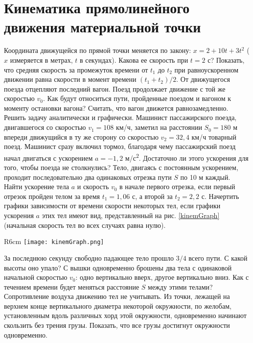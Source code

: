 \section{Кинематика прямолинейного движения материальной точки}
\AddProb Координата движущейся по прямой точки меняется по закону: $x = 2 + 10t + 3t^2$ ($x$ измеряется в метрах, $t$ в секундах). Какова ее скорость при $t = 2$ с?
\AddProb Показать, что средняя скорость за промежуток времени от $t_1$ до $t_2$ при равноускоренном движении равна скорости в момент времени $(t_1 + t_2)/2$.
\AddProb От движущегося поезда отцепляют последний вагон. Поезд продолжает движение с той же скоростью $v_0$. Как будут относиться пути, пройденные поездом и вагоном к моменту остановки вагона? Считать, что вагон движется равнозамедленно. Решить задачу аналитически и графически.
\AddProb Машинист пассажирского поезда, двигавшегося со скоростью $v_1 = 108$ км/ч, заметил на расстоянии $S_0 = 180$ м впереди движущийся в ту же сторону со скоростью $v_2 = 32,4$ км/ч товарный поезд. Машинист сразу включил тормоз, благодаря чему пассажирский поезд начал двигаться с ускорением $a = -1,2$ м/с\textsuperscript{2}. Достаточно ли этого ускорения для того, чтобы поезда не столкнулись?
\AddProb Тело, двигаясь с постоянным ускорением, проходит последовательно два одинаковых отрезка пути $S$ по 10 м каждый. Найти ускорение тела $a$ и скорость $v_0$ в начале первого отрезка, если первый отрезок пройден телом за время $t_1 = 1,06$ с, а второй за $t_2 = 2,2$ с.
\AddProb Начертить графики зависимости от времени скорости некоторых тел, если графики ускорения $a$ этих тел имеют вид, представленный на рис. \ref{kinemGraph} (начальная скорость тел во всех случаях равна нулю).
\begin{wrapfigure}{R}{6cm}
\texttt{[image: kinemGraph.png]}
\caption{}
\label{kinemGraph}
\end{wrapfigure}
\AddProb За последнюю секунду свободно падающее тело прошло $3/4$ всего пути. С какой высоты оно упало?
\AddProb С вышки одновременно брошены два тела с одинаковой начальной скоростью $v_0$: одно вертикально вверх, другое вертикально вниз. Как с течением времени будет меняться расстояние $S$ между этими телами? Сопротивление воздуха движению тел не учитывать.
\AddProb Из точки, лежащей на верхнем конце вертикального диаметра некоторой окружности, по желобам, установленным вдоль различных хорд этой окружности, одновременно начинают скользить без трения грузы. Показать, что все грузы достигнут окружности одновременно.
